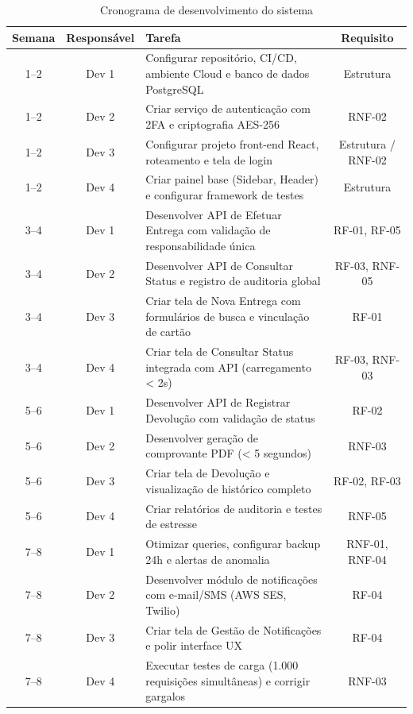 \documentclass[
  article,
  a4paper,
  12pt,
  oneside,
  fleqn
]{abntex2}
\begin{document}
\begin{table}[htb]
\caption{\label{tab:cronograma}Cronograma de desenvolvimento do sistema}
\centering
\footnotesize
\begin{tabular}{c c p{7.5cm} c}
\toprule
\textbf{Semana} & \textbf{Responsável} & \textbf{Tarefa} & \textbf{Requisito} \\
\midrule
1--2 & Dev 1 & Configurar repositório, CI/CD, ambiente Cloud e banco de dados PostgreSQL & Estrutura \\
1--2 & Dev 2 & Criar serviço de autenticação com 2FA e criptografia AES-256 & RNF-02 \\
1--2 & Dev 3 & Configurar projeto front-end React, roteamento e tela de login & Estrutura / RNF-02 \\
1--2 & Dev 4 & Criar painel base (Sidebar, Header) e configurar framework de testes & Estrutura \\
\midrule
3--4 & Dev 1 & Desenvolver API de Efetuar Entrega com validação de responsabilidade única & RF-01, RF-05 \\
3--4 & Dev 2 & Desenvolver API de Consultar Status e registro de auditoria global & RF-03, RNF-05 \\
3--4 & Dev 3 & Criar tela de Nova Entrega com formulários de busca e vinculação de cartão & RF-01 \\
3--4 & Dev 4 & Criar tela de Consultar Status integrada com API (carregamento < 2s) & RF-03, RNF-03 \\
\midrule
5--6 & Dev 1 & Desenvolver API de Registrar Devolução com validação de status & RF-02 \\
5--6 & Dev 2 & Desenvolver geração de comprovante PDF (< 5 segundos) & RNF-03 \\
5--6 & Dev 3 & Criar tela de Devolução e visualização de histórico completo & RF-02, RF-03 \\
5--6 & Dev 4 & Criar relatórios de auditoria e testes de estresse & RNF-05 \\
\midrule
7--8 & Dev 1 & Otimizar queries, configurar backup 24h e alertas de anomalia & RNF-01, RNF-04 \\
7--8 & Dev 2 & Desenvolver módulo de notificações com e-mail/SMS (AWS SES, Twilio) & RF-04 \\
7--8 & Dev 3 & Criar tela de Gestão de Notificações e polir interface UX & RF-04 \\
7--8 & Dev 4 & Executar testes de carga (1.000 requisições simultâneas) e corrigir gargalos & RNF-03 \\
\bottomrule
\end{tabular}
\end{table}
\end{document}
